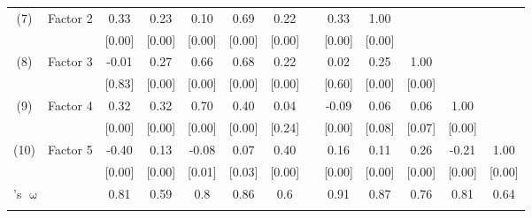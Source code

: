\begin{table}[htbp]
{\begin{tabular}{llccccccccccc}
    \multicolumn{1}{c}{(7)} & Factor 2 & 0.33  & 0.23  & 0.10  & 0.69  & 0.22  &       & 0.33  & 1.00  &       &       &  \\
          &       & [0.00] & [0.00] & [0.00] & [0.00] & [0.00] &       & [0.00] & [0.00] &       &       &  \\
    \multicolumn{1}{c}{(8)} & Factor 3 & -0.01 & 0.27  & 0.66  & 0.68  & 0.22  &       & 0.02  & 0.25  & 1.00  &       &  \\
          &       & [0.83] & [0.00] & [0.00] & [0.00] & [0.00] &       & [0.60] & [0.00] & [0.00] &       &  \\
    \multicolumn{1}{c}{(9)} & Factor 4 & 0.32  & 0.32  & 0.70  & 0.40  & 0.04  &       & -0.09 & 0.06  & 0.06  & 1.00  &  \\
          &       & [0.00] & [0.00] & [0.00] & [0.00] & [0.24] &       & [0.00] & [0.08] & [0.07] & [0.00] &  \\
    \multicolumn{1}{c}{(10)} & Factor 5 & -0.40 & 0.13  & -0.08 & 0.07  & 0.40  &       & 0.16  & 0.11  & 0.26  & -0.21 & 1.00 \\
          &       & [0.00] & [0.00] & [0.01] & [0.03] & [0.00] &       & [0.00] & [0.00] & [0.00] & [0.00] & [0.00] \\
    \midrule
    \multicolumn{2}{l}{\citeauthor{McDonald1999}'s $\upomega$} & 0.81  & 0.59  & 0.8   & 0.86  & 0.6   &       & 0.91  & 0.87  & 0.76  & 0.81  & 0.64 \\
    \bottomrule
	\Tablenote{13}{p-value between [hooks].} \\
    \end{tabular}%
	}
  \label{tab:corrbig5efa}%
\end{table}%
